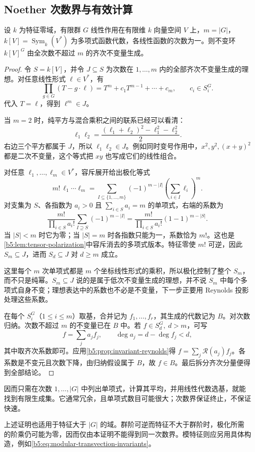 \subsection{Noether 次数界与有效计算}
\label{b5:subsec:2202:04}

\begin{theorem}\label{b5:thm:noether-degree-bound}
	设 \(k\) 为特征零域，有限群 \(G\) 线性作用在有限维 \(k\) 向量空间 \(V\) 上，\(m=|G|\)，\(k[V]=\operatorname{Sym}_k(V^*)\) 为多项式函数代数，各线性函数的次数为一。则不变环 \(k[V]^G\) 由全次数不超过 \(m\) 的齐次不变量生成。
\end{theorem}
\begin{proof}
	令 \(S=k[V]\)，并令 \(J\subseteq S\) 为次数在 \(1,\ldots,m\) 内的全部齐次不变量生成的理想。对任意线性形式 \(\ell\in V^*\)，有
	\[
		\prod_{g\in G}(T-g\cdot\ell) =T^m+c_1T^{m-1}+\cdots+c_m,\qquad c_i\in S_i^G.
	\]
	代入 \(T=\ell\)，得到 \(\ell^m\in J\)。

	当 \(m=2\) 时，纯平方与混合乘积之间的联系已经可以看清：
	\[
		\ell_1\ell_2 =\frac{(\ell_1+\ell_2)^2-\ell_1^2-\ell_2^2}{2}.
	\]
	右边三个平方都属于 \(J\)，所以 \(\ell_1\ell_2\in J\)。例如同时变号作用中，\(x^2,y^2,(x+y)^2\) 都是二次不变量，这个等式把 \(xy\) 也写成它们的线性组合。

	对任意 \(\ell_1,\ldots,\ell_m\in V^*\)，容斥展开给出极化等式
	\[
		m!\,\ell_1\cdots\ell_m =\sum_{I\subseteq\{1,\ldots,m\}}(-1)^{m-|I|} \left(\sum_{i\in I}\ell_i\right)^m.
	\]
	对支集为 \(S\)、各指数为 \(a_i>0\) 且 \(\sum_{i\in S}a_i=m\) 的单项式，右端的系数为
	\[
		\frac{m!}{\prod_{i\in S}a_i!} \sum_{I\supseteq S}(-1)^{m-|I|} =\frac{m!}{\prod_{i\in S}a_i!}(1-1)^{m-|S|}.
	\]
	当 \(|S|<m\) 时它为零；当 \(|S|=m\) 时各指数只能为一，系数恰为 \(m!\)。这也是\cref{b5:lem:tensor-polarization}中容斥消去的多项式版本。特征零使 \(m!\) 可逆，因此 \(S_m\subseteq J\)，进而 \(S_d\subseteq J\) 对 \(d\ge m\) 成立。

	这里每个 \(m\) 次单项式都是 \(m\) 个坐标线性形式的乘积，所以极化控制了整个 \(S_m\)，而不只是纯幂。\(S_m\subseteq J\) 说的是属于低次不变量生成的理想，并不说 \(S_m\) 中每个多项式自身不变；理想表达中的系数也不必是不变量，下一步正要用 Reynolds 投影处理这些系数。

	在每个 \(S_i^G\)（\(1\le i\le m\)）取基，合并记为 \(f_1,\ldots,f_r\)，其生成的代数记为 \(B\)。对次数归纳。次数不超过 \(m\) 的不变量已在 \(B\) 中。若 \(f\in S_d^G,\ d>m\)，可写
	\[
		f=\sum_j a_jf_j,\qquad \deg a_j=d-\deg f_j<d,
	\]
	其中取齐次系数即可。应用\cref{b5:prop:invariant-reynolds}得 \(f=\sum_j\mathcal R(a_j)f_j\)。各系数是不变元且次数下降，由归纳假设属于 \(B\)，故 \(f\in B\)。最后拆分齐次分量便得到全部结论。
\end{proof}

因而只需在次数 \(1,\ldots,|G|\) 中列出单项式，计算其平均，并用线性代数选基，就能找到有限生成集。它通常冗余，且单项式数目可能很大；次数界保证终止，不保证快速。

\ProseParagraphBreak
上述证明也适用于特征大于 \(|G|\) 的域。群阶可逆而特征不大于群阶时，极化所需的阶乘仍可能为零，因而仅由本证明不能得到同一次数界。模特征则应另用具体构造，例如\eqref{b5:eq:modular-transvection-invariants}。
